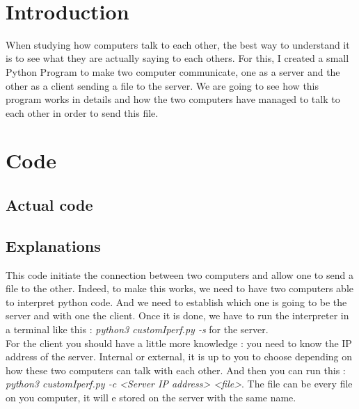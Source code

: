 \documentclass[a4paper]{article}
\title{\underline{\textbf{\begin{Huge}Network\end{Huge}}}\\\vspace{1cm}
    \begin{huge}
        \textbf{Client / Server communication study}
    \end{huge}\\}
\author{
        Tom Moulard (16920041)
        \date{}
        }
\begin{document}
\maketitle
\begin{center}
\vspace{1cm}
\date{2017 June 12}
\vspace{2cm}\\
\end{center}    
    \thispagestyle{empty}

\newpage{}

\tableofcontents
\thispagestyle{empty}

\newpage
\section{Introduction}

When studying how computers talk to each other, the best way to understand it is to see what they are actually saying to each others.
For this, I created a small Python Program to make two computer communicate, one as a server and the other as a client sending a file to the server.
We are going to see how this program works in details and how the two computers have managed to talk to each other in order to send this file.  

\section{Code}

\subsection{Actual code}


\subsection{Explanations}

This code initiate the connection between two computers and allow one to send a file to the other.
Indeed, to make this works, we need to have two computers able to interpret python code.
And we need to establish which one is going to be the server and with one the client.
Once it is done, we have to run the interpreter in a terminal like this : \textit{python3 customIperf.py -s} for the server.\\
For the client you should have a little more knowledge : you need to know the IP address of the server. Internal or external, it is up to you to choose depending on how these two computers can talk with each other. And then you can run this : \textit{python3 customIperf.py -c <Server IP address> <file>}. The file can be every file on you computer, it will e stored on the server with the same name.
\end{document}
